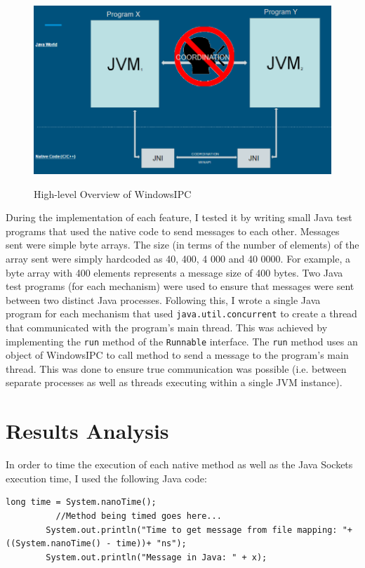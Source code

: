 \documentclass[12pt] {newrucsthesis}    %
\def\code#1{\texttt{#1}}
\begin{document}
      \begin{figure}[H]
        \includegraphics[scale=0.7]{SystemOverview}
        \label{fig:SystemOverview}
        \caption{High-level Overview of WindowsIPC}
      \end{figure}


      During the implementation of each feature, I tested it by writing small Java test programs that used the native code to send
      messages to each other. Messages sent were simple byte arrays. The size (in terms of the number of elements)
      of the array sent were simply hardcoded as 40, 400, 4 000 and 40 0000. For example, a byte array with 400
      elements represents a message size of 400 bytes. Two Java test programs (for each mechanism) were used to ensure that messages were sent between two
      distinct Java processes. Following this, I wrote a single Java program for each mechanism that used \code{java.util.concurrent} to create a thread
      that communicated with the program's main thread. This was achieved by implementing the \code{run} method of the \code{Runnable}
      interface. The \code{run} method uses an object of WindowsIPC to call method to send a message to the program's main thread. This was done
      to ensure true communication was possible (i.e. between separate processes as well as threads executing within a single JVM instance).


    \section{Results Analysis} \label{results}
      In order to time the execution of each native method as well as the Java Sockets execution time, I used the following Java code:
      \begin {lstlisting}[caption=Java Timing Code]
        long time = System.nanoTime();
          //Method being timed goes here...
        System.out.println("Time to get message from file mapping: "+ ((System.nanoTime() - time))+ "ns");
        System.out.println("Message in Java: " + x);
      \end{lstlisting}
\end{document}
